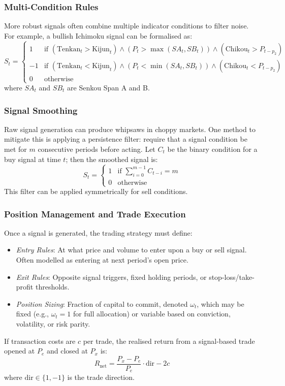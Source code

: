 \subsubsection{Multi-Condition Rules}

More robust signals often combine multiple indicator conditions to filter noise. For example, a bullish Ichimoku signal can be formalised as:
\[
S_t =
\begin{cases}
1 & \text{if } (\text{Tenkan}_t > \text{Kijun}_t) \land (P_t > \max(SA_t, SB_t)) \land (\text{Chikou}_t > P_{t-p_2}) \\
-1 & \text{if } (\text{Tenkan}_t < \text{Kijun}_t) \land (P_t < \min(SA_t, SB_t)) \land (\text{Chikou}_t < P_{t-p_2}) \\
0 & \text{otherwise}
\end{cases}
\]
where $SA_t$ and $SB_t$ are Senkou Span A and B.

\subsubsection{Signal Smoothing}

Raw signal generation can produce whipsaws in choppy markets. One method to mitigate this is applying a persistence filter: require that a signal condition be met for $m$ consecutive periods before acting. Let $C_t$ be the binary condition for a buy signal at time $t$; then the smoothed signal is:
\[
S_t =
\begin{cases}
1 & \text{if } \sum_{i=0}^{m-1} C_{t-i} = m \\
0 & \text{otherwise}
\end{cases}
\]
This filter can be applied symmetrically for sell conditions.

\subsubsection{Position Management and Trade Execution}

Once a signal is generated, the trading strategy must define:
\begin{itemize}
    \item \textit{Entry Rules}: At what price and volume to enter upon a buy or sell signal. Often modelled as entering at next period's open price.
    \item \textit{Exit Rules}: Opposite signal triggers, fixed holding periods, or stop-loss/take-profit thresholds.
    \item \textit{Position Sizing}: Fraction of capital to commit, denoted $\omega_t$, which may be fixed (e.g., $\omega_t = 1$ for full allocation) or variable based on conviction, volatility, or risk parity.
\end{itemize}
If transaction costs are $c$ per trade, the realised return from a signal-based trade opened at $P_e$ and closed at $P_x$ is:
\[
R_{\text{net}} = \frac{P_x - P_e}{P_e} \cdot \text{dir} - 2c
\]
where $\text{dir} \in \{1, -1\}$ is the trade direction.

